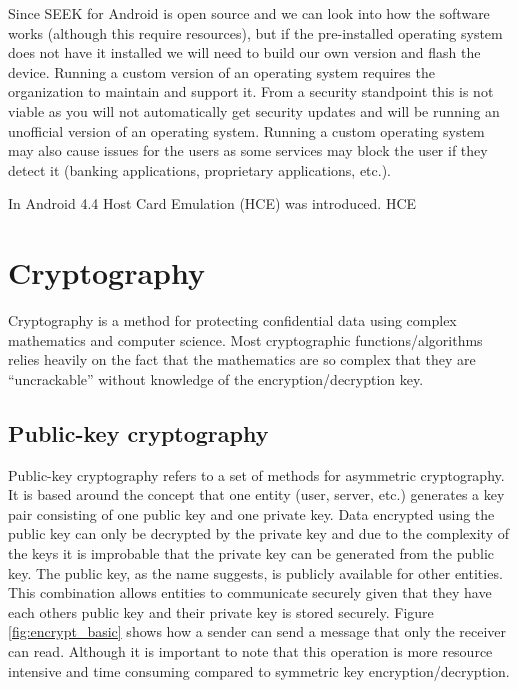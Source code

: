 Since SEEK for Android is open source and we can look into how the software works (although this require resources), but if the pre-installed operating system does not have it installed we will need to build our own version and flash the device. Running a custom version of an operating system requires the organization to maintain and support it. From a security standpoint this is not viable as you will not automatically get security updates and will be running an unofficial version of an operating system. Running a custom operating system may also cause issues for the users as some services may block the user if they detect it (banking applications, proprietary applications, etc.).

In Android 4.4 Host Card Emulation (HCE) was introduced. HCE

\section{Cryptography}
Cryptography is a method for protecting confidential data using complex mathematics and computer science. Most cryptographic functions/algorithms relies heavily on the fact that the mathematics are so complex that they are ``uncrackable'' without knowledge of the encryption/decryption key.

\subsection{Public-key cryptography}
\label{sec:publicKeyCrypto}
Public-key cryptography refers to a set of methods for asymmetric cryptography. It is based around the concept that one entity (user, server, etc.) generates a key pair consisting of one public key and one private key. Data encrypted using the public key can only be decrypted by the private key and due to the complexity of the keys it is improbable that the private key can be generated from the public key. The public key, as the name suggests, is publicly available for other entities. This combination allows entities to communicate securely given that they have each others public key and their private key is stored securely. Figure \ref{fig:encrypt_basic} shows how a sender can send a message that only the receiver can read. Although it is important to note that this operation is more resource intensive and time consuming compared to symmetric key encryption/decryption.

